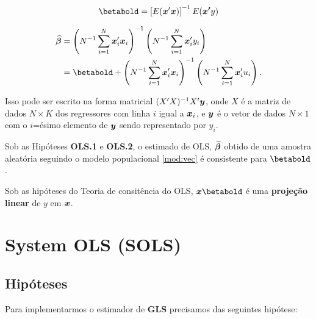 \documentclass[11pt,oneside,a4paper]{article}
\numberwithin{equation}{section}
\begin{document}
\vspace{-1 em}
\begin{align*}
	\betabold = \left[ E(\mbs{x}'\mbs{x}) \right]^{-1} E(\mbs{x'}y)
\end{align*}

\vspace{-1 em}
\begin{align*}
\betahatbold 
&=
\left( N^{-1} \sum_{i=1}^{N} \mbs{x}_{i}' \mbs{x}_{i} \right)^{-1} 
\left( N^{-1} \sum_{i=1}^{N} \mbs{x}_{i}' y_{i} \right)
\\
&=
\betabold +
\left( N^{-1} \sum_{i=1}^{N} \mbs{x}_{i}' \mbs{x}_{i} \right)^{-1} 
\left( N^{-1} \sum_{i=1}^{N} \mbs{x}_{i}' u_{i} \right).
\end{align*}

\noindent
Isso pode ser escrito na forma matricial $(X'X)^{-1}X' \boldsymbol{y}$, onde $X$ é a matriz de dados $N \times K$ dos regressores com linha $i$ igual a $\boldsymbol{x}_{i}$, e $\boldsymbol{y}$ é o vetor de dados $N \times 1$ com o $i$=ésimo elemento de $\boldsymbol{y}$ sendo representado por $y_{i}$.

\begin{teo1}
	Sob as Hipóteses \textbf{OLS.1} e \textbf{OLS.2}, o estimado de OLS, $\widehat{\boldsymbol{\beta}}$ obtido de uma amostra aleatória seguindo o modelo populacional \eqref{mod:vec} é consistente para $\betabold$.
\end{teo1}

Sob as hipóteses do Teoria de consitência do OLS, $\mbs{x} \betabold$ é uma \textbf{projeção linear} de $y$ em $\boldsymbol{x}$.


\clearpage
\section{System OLS (SOLS)}

\noindent
\citet[C.7 -- The Single-Equation Linear Model and OLS Estimation]{wool-2010}

\noindent
\citet[C.10 -- The Single-Equation Linear Model and OLS Estimation]{wool-2010}

\clearpage
\subsection*{Hipóteses}

Para implementarmos o estimador de \textbf{GLS} precisamos das seguintes hipótese:
\end{document}
